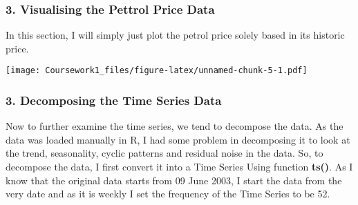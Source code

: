 \documentclass[
]{article}
\newenvironment{Shaded}{\begin{snugshade}}{\end{snugshade}}
\newcommand{\AttributeTok}[1]{\textcolor[rgb]{0.13,0.29,0.53}{#1}}
\newcommand{\DecValTok}[1]{\textcolor[rgb]{0.00,0.00,0.81}{#1}}
\newcommand{\FunctionTok}[1]{\textcolor[rgb]{0.13,0.29,0.53}{\textbf{#1}}}
\newcommand{\NormalTok}[1]{#1}
\newcommand{\OtherTok}[1]{\textcolor[rgb]{0.56,0.35,0.01}{#1}}
\newcommand{\SpecialCharTok}[1]{\textcolor[rgb]{0.81,0.36,0.00}{\textbf{#1}}}
\newcommand{\StringTok}[1]{\textcolor[rgb]{0.31,0.60,0.02}{#1}}
\begin{document}
\hypertarget{visualising-the-pettrol-price-data}{%
\subsubsection{3. Visualising the Pettrol Price
Data}\label{visualising-the-pettrol-price-data}}

In this section, I will simply just plot the petrol price solely based
in its historic price.

\begin{Shaded}
\end{Shaded}

\texttt{[image: Coursework1\_files/figure-latex/unnamed-chunk-5-1.pdf]}

\hypertarget{decomposing-the-time-series-data}{%
\subsubsection{3. Decomposing the Time Series
Data}\label{decomposing-the-time-series-data}}

Now to further examine the time series, we tend to decompose the data.
As the data was loaded manually in R, I had some problem in decomposing
it to look at the trend, seasonality, cyclic patterns and residual noise
in the data. So, to decompose the data, I first convert it into a Time
Series Using function \textbf{ts()}. As I know that the original data
starts from 09 June 2003, I start the data from the very date and as it
is weekly I set the frequency of the Time Series to be 52.

\begin{Shaded}
\end{Shaded}
\end{document}
